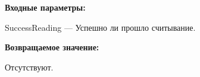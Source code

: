 \textbf{Входные параметры:}

SuccessReading --- Успешно ли прошло считывание.

\textbf{Возвращаемое значение:}

Отсутствуют.